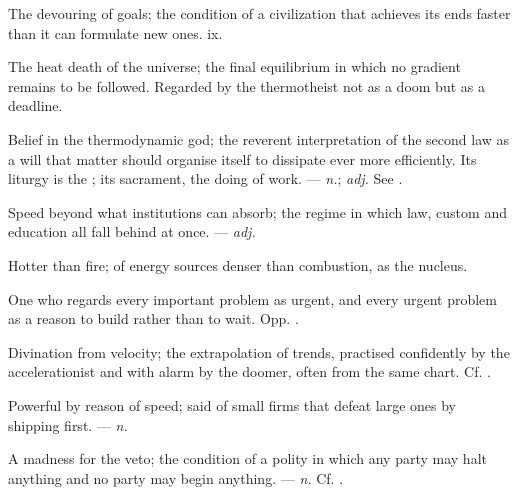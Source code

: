  The devouring of goals; the condition of a civilization that achieves its ends faster than it can formulate new ones.   ix.

 The heat death of the universe; the final equilibrium in which no gradient remains to be followed. Regarded by the thermotheist not as a doom but as a deadline. 

 Belief in the thermodynamic god; the reverent interpretation of the second law as a will that matter should organise itself to dissipate ever more efficiently. Its liturgy is the ; its sacrament, the doing of work. ---  \textit{n.};  \textit{adj.} See .

 Speed beyond what institutions can absorb; the regime in which law, custom and education all fall behind at once. ---  \textit{adj.}

 Hotter than fire; of energy sources denser than combustion, as the nucleus. 

 One who regards every important problem as urgent, and every urgent problem as a reason to build rather than to wait. Opp. .

 Divination from velocity; the extrapolation of trends, practised confidently by the accelerationist and with alarm by the doomer, often from the same chart. Cf. .

 Powerful by reason of speed; said of small firms that defeat large ones by shipping first. ---  \textit{n.}

 A madness for the veto; the condition of a polity in which any party may halt anything and no party may begin anything. ---  \textit{n.} Cf. .

